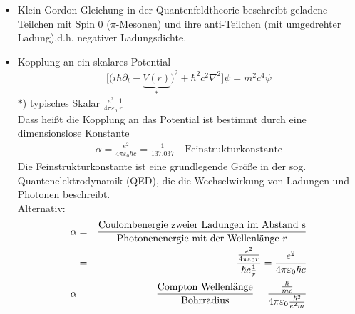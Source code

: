 \begin{itemize}
\item Klein-Gordon-Gleichung in der Quantenfeldtheorie beschreibt geladene Teilchen mit Spin 0 ($\pi$-Mesonen) und ihre anti-Teilchen (mit umgedrehter Ladung),d.h. negativer Ladungsdichte.

\item Kopplung an ein skalares Potential
\begin{eqnarray*} \Bigg [ \Big ( i \hbar \partial _t - \underbrace{V(r)}_* \Big )^2 + \hbar ^2 c^2\nabla ^ 2 \Bigg ] \psi = m^2c^4 \psi \end{eqnarray*}
$*$) typisches Skalar $\frac{e^2}{4 \pi \varepsilon_0} \frac 1 r$\\
Dass heißt die Kopplung an das Potential ist bestimmt durch eine dimensionslose Konstante
\begin{eqnarray*} \boxed{\alpha  = \frac{e^2}{4 \pi \varepsilon_0 \hbar c} = \frac 1 {137.037}} \quad\text{Feinstrukturkonstante}\end{eqnarray*}
Die Feinstrukturkonstante ist eine grundlegende Größe in der sog. Quantenelektrodynamik (QED), die die Wechselwirkung von Ladungen und Photonen beschreibt.\\
Alternativ:
\begin{eqnarray*} \alpha &=& \frac{\text{Coulombenergie zweier Ladungen im Abstand s}}{\text{Photonenenergie  mit der Wellenlänge }r}\\
&=&\frac{\frac{e^2}{4\pi\varepsilon_0 r}}{\hbar c \frac 1 r} = \frac{e^2}{4 \pi\varepsilon_0 \hbar c}\\
\alpha &=& \frac{\text{Compton Wellenlänge}}{\text{Bohrradius}} = \frac{\frac{\hbar}{m c}}{4 \pi \varepsilon_0\frac{\hbar^2}{e^2m}}
\end{eqnarray*}
\end{itemize}
